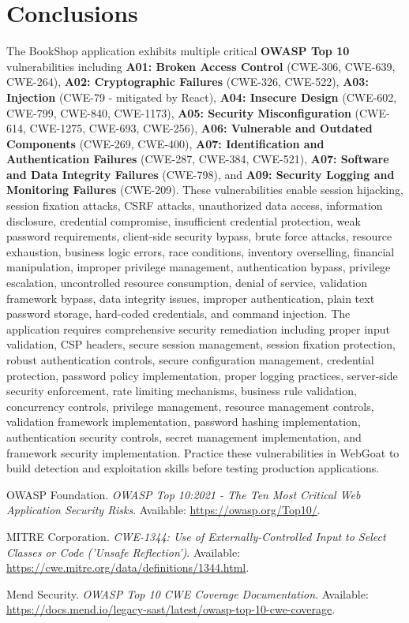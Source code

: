 \documentclass[]{UCD_CS_FYP_Report}
\begin{document}
\chapter{Conclusions}

The BookShop application exhibits multiple critical \textbf{OWASP Top 10} vulnerabilities including \textbf{A01: Broken Access Control} (CWE-306, CWE-639, CWE-264), \textbf{A02: Cryptographic Failures} (CWE-326, CWE-522), \textbf{A03: Injection} (CWE-79 - mitigated by React), \textbf{A04: Insecure Design} (CWE-602, CWE-799, CWE-840, CWE-1173), \textbf{A05: Security Misconfiguration} (CWE-614, CWE-1275, CWE-693, CWE-256), \textbf{A06: Vulnerable and Outdated Components} (CWE-269, CWE-400), \textbf{A07: Identification and Authentication Failures} (CWE-287, CWE-384, CWE-521), \textbf{A07: Software and Data Integrity Failures} (CWE-798), and \textbf{A09: Security Logging and Monitoring Failures} (CWE-209). These vulnerabilities enable session hijacking, session fixation attacks, CSRF attacks, unauthorized data access, information disclosure, credential compromise, insufficient credential protection, weak password requirements, client-side security bypass, brute force attacks, resource exhaustion, business logic errors, race conditions, inventory overselling, financial manipulation, improper privilege management, authentication bypass, privilege escalation, uncontrolled resource consumption, denial of service, validation framework bypass, data integrity issues, improper authentication, plain text password storage, hard-coded credentials, and command injection. The application requires comprehensive security remediation including proper input validation, CSP headers, secure session management, session fixation protection, robust authentication controls, secure configuration management, credential protection, password policy implementation, proper logging practices, server-side security enforcement, rate limiting mechanisms, business rule validation, concurrency controls, privilege management, resource management controls, validation framework implementation, password hashing implementation, authentication security controls, secret management implementation, and framework security implementation. Practice these vulnerabilities in WebGoat to build detection and exploitation skills before testing production applications.


\newpage
\begin{thebibliography}{99}
 OWASP Foundation. \emph{OWASP Top 10:2021 - The Ten Most Critical Web Application Security Risks}. Available: \url{https://owasp.org/Top10/}.

 MITRE Corporation. \emph{CWE-1344: Use of Externally-Controlled Input to Select Classes or Code ('Unsafe Reflection')}. Available: \url{https://cwe.mitre.org/data/definitions/1344.html}.

 Mend Security. \emph{OWASP Top 10 CWE Coverage Documentation}. Available: \url{https://docs.mend.io/legacy-sast/latest/owasp-top-10-cwe-coverage}.
\end{thebibliography}
\label{endpage}
\end{document}
